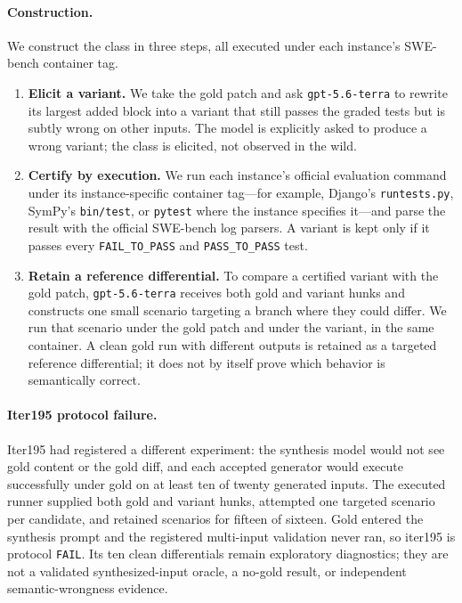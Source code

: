 \documentclass[11pt]{article}
\begin{document}
\paragraph{Construction.} We construct the class in three steps, all executed under each instance's
SWE-bench container tag.
\begin{enumerate}
  \item \textbf{Elicit a variant.} We take the gold patch and ask \texttt{gpt-5.6-terra} to rewrite its largest
  added block into a variant that still passes the graded tests but is subtly wrong on other inputs. The
  model is explicitly asked to produce a wrong variant; the class is elicited, not observed in the wild.
  \item \textbf{Certify by execution.} We run each instance's official evaluation command under its
  instance-specific container tag---for example, Django's \texttt{runtests.py}, SymPy's \texttt{bin/test}, or \texttt{pytest}
  where the instance specifies it---and parse the result with the official SWE-bench log parsers. A variant
  is kept only if it passes every
  \texttt{FAIL\_TO\_PASS} and \texttt{PASS\_TO\_PASS} test.
  \item \textbf{Retain a reference differential.} To compare a certified variant with the gold patch,
  \texttt{gpt-5.6-terra} receives both gold and variant hunks and constructs one small scenario targeting a
  branch where they could differ. We run that scenario under the gold patch and under the variant, in the
  same container. A clean gold run with different outputs is retained as a targeted reference differential;
  it does not by itself prove which behavior is semantically correct.
\end{enumerate}

\paragraph{Iter195 protocol failure.} Iter195 had registered a different experiment: the synthesis model
would not see gold content or the gold diff, and each accepted generator would execute successfully under
gold on at least ten of twenty generated inputs. The executed runner supplied both gold and variant hunks,
attempted one targeted scenario per candidate, and retained scenarios for fifteen of sixteen. Gold entered
the synthesis prompt and the registered
multi-input validation never ran, so iter195 is protocol \texttt{FAIL}. Its ten clean differentials remain
exploratory diagnostics; they are not a validated synthesized-input oracle, a no-gold result, or independent
semantic-wrongness evidence.
\end{document}
